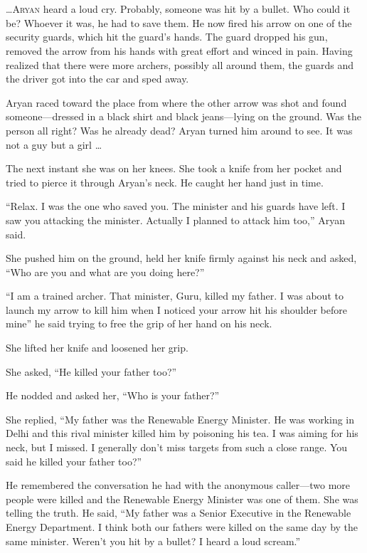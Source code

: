\chapter{}

\lettrine{…}{Aryan} heard a loud cry. Probably, someone was hit by a bullet. Who could it
be? Whoever it was, he had to save them. He now fired his arrow on one of the
security guards, which hit the guard's hands. The guard dropped his gun, removed
the arrow from his hands with great effort and winced in pain. Having realized
that there were more archers, possibly all around them, the guards and the
driver got into the car and sped away.

Aryan raced toward the place from where the other arrow was shot and found
someone—dressed in a black shirt and black jeans—lying on the ground. Was
the person all right? Was he already dead? Aryan turned him around to see. It
was not a guy but a girl …

The next instant she was on her knees. She took a knife from her pocket and
tried to pierce it through Aryan's neck. He caught her hand just in time.

“Relax. I was the one who saved you. The minister and his guards have left. I
saw you attacking the minister. Actually I planned to attack him too,” Aryan
said.

She pushed him on the ground, held her knife firmly against his neck and asked,
“Who are you and what are you doing here?”

“I am a trained archer. That minister, Guru, killed my father. I was about to
launch my arrow to kill him when I noticed your arrow hit his shoulder before
mine” he said trying to free the grip of her hand on his neck.

She lifted her knife and loosened her grip.

She asked, “He killed your father too?”

He nodded and asked her, “Who is your father?”

She replied, “My father was the Renewable Energy Minister. He was working in
Delhi and this rival minister killed him by poisoning his tea. I was aiming for
his neck, but I missed. I generally don't miss targets from such a close range.
You said he killed your father too?”

He remembered the conversation he had with the anonymous caller—two more people
were killed and the Renewable Energy
Minister was one of them. She was telling the truth. He said, “My father was a
Senior Executive in the Renewable Energy Department. I think both our fathers
were killed on the same day by the same minister. Weren't you hit by a bullet? I
heard a loud scream.”

